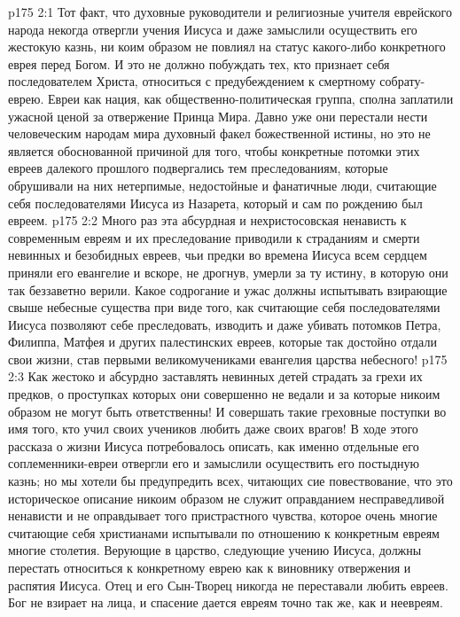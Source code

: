 \vs p175 2:1 Тот факт, что духовные руководители и религиозные учителя еврейского народа некогда отвергли учения Иисуса и даже замыслили осуществить его жестокую казнь, ни коим образом не повлиял на статус какого\hyp{}либо конкретного еврея перед Богом. И это не должно побуждать тех, кто признает себя последователем Христа, относиться с предубеждением к смертному собрату\hyp{}еврею. Евреи как нация, как общественно\hyp{}политическая группа, сполна заплатили ужасной ценой за отвержение Принца Мира. Давно уже они перестали нести человеческим народам мира духовный факел божественной истины, но это не является обоснованной причиной для того, чтобы конкретные потомки этих евреев далекого прошлого подвергались тем преследованиям, которые обрушивали на них нетерпимые, недостойные и фанатичные люди, считающие себя последователями Иисуса из Назарета, который и сам по рождению был евреем.
\vs p175 2:2 Много раз эта абсурдная и нехристосовская ненависть к современным евреям и их преследование приводили к страданиям и смерти невинных и безобидных евреев, чьи предки во времена Иисуса всем сердцем приняли его евангелие и вскоре, не дрогнув, умерли за ту истину, в которую они так беззаветно верили. Какое содрогание и ужас должны испытывать взирающие свыше небесные существа при виде того, как считающие себя последователями Иисуса позволяют себе преследовать, изводить и даже убивать потомков Петра, Филиппа, Матфея и других палестинских евреев, которые так достойно отдали свои жизни, став первыми великомучениками евангелия царства небесного!
\vs p175 2:3 Как жестоко и абсурдно заставлять невинных детей страдать за грехи их предков, о проступках которых они совершенно не ведали и за которые никоим образом не могут быть ответственны! И совершать такие греховные поступки во имя того, кто учил своих учеников любить даже своих врагов! В ходе этого рассказа о жизни Иисуса потребовалось описать, как именно отдельные его соплеменники\hyp{}евреи отвергли его и замыслили осуществить его постыдную казнь; но мы хотели бы предупредить всех, читающих сие повествование, что это историческое описание никоим образом не служит оправданием несправедливой ненависти и не оправдывает того пристрастного чувства, которое очень многие считающие себя христианами испытывали по отношению к конкретным евреям многие столетия. Верующие в царство, следующие учению Иисуса, должны перестать относиться к конкретному еврею как к виновнику отвержения и распятия Иисуса. Отец и его Сын\hyp{}Творец никогда не переставали любить евреев. Бог не взирает на лица, и спасение дается евреям точно так же, как и неевреям.
